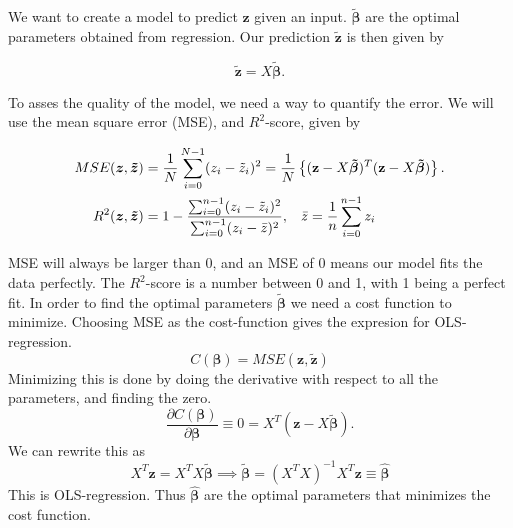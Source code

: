 \documentclass[reprint,english,notitlepage,aps,nobalancelastpage,nofootinbib]{revtex4-1}  %
\newcommand{\vc}[1]{\mathbf{#1}}
\begin{document}
We want to create a model to predict $\vc{z}$ given an input. $\boldsymbol{\tilde\beta}$ are the optimal parameters obtained from regression. Our prediction \(\boldsymbol{\tilde{\vc{z}}}\) is then given by

\begin{equation*}
	\boldsymbol{\tilde{z}} = X\boldsymbol{\tilde{\beta}}.
\end{equation*}

To asses the quality of the model, we need a way to quantify the error. We will use the mean square error (MSE), and $R^2$-score, given by

{\large
\begin{align*}
	MSE(\boldsymbol{z}, \boldsymbol{\tilde{z}}) &= \frac{1}{N}\sum_{i=0}^{N-1} (z_i - \tilde{z}_i)^2 = \frac{1}{N}\left\{(\vc{z} - X\boldsymbol{\tilde{\beta}})^T(\vc{z} - X\boldsymbol{\tilde{\beta}})\right\}.
	\\
	R^2(\boldsymbol{z}, \boldsymbol{\tilde{z}}) &= 1 - \frac{\sum_{i=0}^{n-1}(z_i - \tilde{z}_i)^2}{\sum_{i=0}^{n-1}(z_i - \bar{z})^2}, \hspace{3mm} \bar{z} = \frac{1}{n}\sum_{i=0}^{n-1}z_i
\end{align*}
}%

MSE will always be larger than 0, and an MSE of 0 means our model fits the data perfectly. The $R^2$-score is a number between 0 and 1, with 1 being a perfect fit. In order to find the optimal parameters $\boldsymbol{\tilde{\beta}}$ we need a cost function to minimize. Choosing MSE as the cost-function gives the expresion for OLS-regression.
\begin{equation*}
	C(\boldsymbol{\beta}) = MSE(\boldsymbol{z}, \boldsymbol{\tilde{z}})
\end{equation*}
Minimizing this is done by doing the derivative with respect to all the parameters, and finding the zero.
\begin{equation}\label{eq:Const_OLS}
	\frac{\partial C(\boldsymbol{\beta})}{\partial \boldsymbol{\beta}} \equiv 0 = X^T(\boldsymbol{z} - X\boldsymbol{\tilde{\beta}}).
\end{equation}
We can rewrite this as
\begin{equation}\label{eq:OLS_beta}
	X^T\vc{z} = X^TX\boldsymbol{\tilde{\beta}} \implies \boldsymbol{\tilde{\beta}} = (X^TX)^{-1} X^T \vc{z} \equiv \boldsymbol{\hat{\beta}}
\end{equation}
This is OLS-regression. Thus $\boldsymbol{\hat{\beta}}$ are the optimal parameters that minimizes the cost function.
\end{document}
